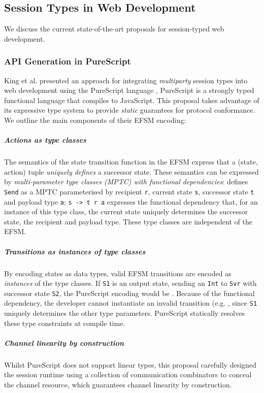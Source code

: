 \subsection{Session Types in Web Development}
\label{subsection:sessiontypewebdev}

We discuss the current state-of-the-art proposals
for session-typed web development.

\subsubsection{API Generation in PureScript \cite{PureScript2019}}
King et al. presented an approach
for integrating \textit{multiparty} session types 
into web development using 
the PureScript language \cite{PureScript},
PureScript is a strongly typed functional language
that compiles to JavaScript.
This proposal takes advantage of its expressive type system to 
provide \textit{static} guarantees for protocol conformance.
We outline the main components of their EFSM encoding:

\subparagraph{Actions as type classes} 
The semantics of the state transition function 
in the EFSM express that a (state, action) tuple
\textit{uniquely defines} a successor state. 
These semantics can be expressed by 
\textit{multi-parameter type classes (MPTC) 
with functional dependencies}: 
defines \texttt{Send} as a MPTC 
parameterised by recipient \texttt{r}, 
current state \texttt{s}, successor state \texttt{t} 
and payload type \texttt{a}; 
\texttt{s -> t r a} expresses the functional dependency that, 
for an instance of this type class, 
the current state uniquely determines the
successor state, the recipient and payload type. 
These type classes are independent of the EFSM.

\subparagraph{Transitions as instances of type classes} 
By encoding states as data types, 
valid EFSM transitions are encoded as 
\textit{instances} of the type classes. 
If \texttt{S1} is an output state, 
sending an \texttt{Int} to \texttt{Svr} with 
successor state \texttt{S2}, the PureScript encoding would be
.
Because of the functional dependency, 
the developer cannot instantiate an invalid transition 
(e.g. , 
since \texttt{S1} uniquely determines the other type parameters. 
PureScript statically resolves these type constraints at
compile time.

\subparagraph{Channel linearity by construction}
Whilst PureScript does not support linear types,
this proposal carefully designed the session runtime using 
a collection of communication combinators to conceal the
channel resource, which guarantees channel linearity by construction.\\

